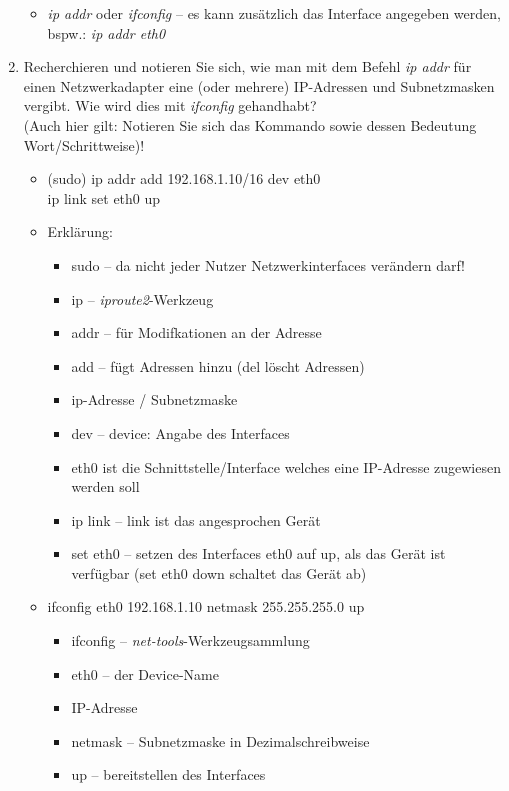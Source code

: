 \documentclass[paper=a4,fontsize=11pt]{scrartcl}%
\numberwithin{equation}{section}
\begin{document}
\begin{enumerate}
 	\begin{itemize}
 		\item \emph{ip addr} oder \emph{ifconfig} -- es kann zusätzlich das Interface angegeben werden, bspw.: \emph{ip addr eth0}
 	\end{itemize}
	\item Recherchieren und notieren Sie sich, wie man mit dem Befehl \emph{ip addr} für einen Netzwerkadapter eine (oder mehrere) IP-Adressen und Subnetzmasken vergibt. Wie wird dies mit  \emph{ifconfig} gehandhabt?\\
	(Auch hier gilt: Notieren Sie sich das Kommando sowie dessen Bedeutung Wort/Schrittweise)!
 \begin{itemize}
 	\item (sudo) ip addr add 192.168.1.10/16 dev eth0\\
 	ip link set eth0 up
 	\item Erklärung:
 	\begin{itemize}
 		\item sudo -- da nicht jeder Nutzer Netzwerkinterfaces verändern darf!
 		\item ip -- \emph{iproute2}-Werkzeug
 		\item addr -- für Modifkationen an der Adresse
 		\item add -- fügt Adressen hinzu (del löscht Adressen)
 		\item ip-Adresse / Subnetzmaske
 		\item dev -- device: Angabe des Interfaces
 		\item eth0 ist die Schnittstelle/Interface welches eine IP-Adresse zugewiesen werden soll
 		\item ip link -- link ist das angesprochen Gerät
 		\item set eth0 -- setzen des Interfaces eth0 auf up, als das Gerät ist verfügbar (set eth0 down schaltet das Gerät ab) 
 	\end{itemize}
 	\item ifconfig eth0 192.168.1.10 netmask 255.255.255.0 up
 	\begin{itemize}
 		\item ifconfig -- \emph{net-tools}-Werkzeugsammlung
 		\item eth0 -- der Device-Name
 		\item IP-Adresse
 		\item netmask -- Subnetzmaske in Dezimalschreibweise
 		\item up -- bereitstellen des Interfaces

\end{itemize}
\end{itemize}
\end{enumerate}
\end{document}
